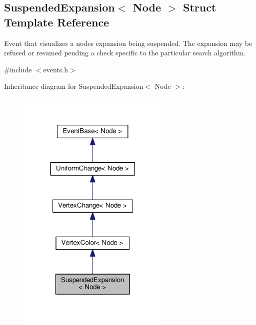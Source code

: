 \hypertarget{structSuspendedExpansion}{}\subsection{Suspended\+Expansion$<$ Node $>$ Struct Template Reference}
\label{structSuspendedExpansion}


Event that visualizes a node\textquotesingle{}s expansion being suspended. The expansion may be refused or resumed pending a check specific to the particular search algorithm.  




{\ttfamily \#include $<$events.\+h$>$}



Inheritance diagram for Suspended\+Expansion$<$ Node $>$\+:\nopagebreak
\begin{figure}[H]
\begin{center}
\leavevmode
\includegraphics[width=206pt]{structSuspendedExpansion__inherit__graph}
\end{center}
\end{figure}



